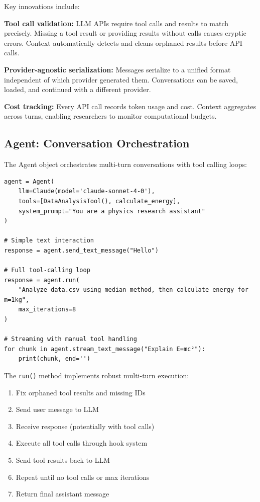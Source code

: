 \documentclass{article}
\begin{document}
Key innovations include:

\textbf{Tool call validation:} LLM APIs require tool calls and results to match precisely. Missing a tool result or providing results without calls causes cryptic errors. Context automatically detects and cleans orphaned results before API calls.

\textbf{Provider-agnostic serialization:} Messages serialize to a unified format independent of which provider generated them. Conversations can be saved, loaded, and continued with a different provider.

\textbf{Cost tracking:} Every API call records token usage and cost. Context aggregates across turns, enabling researchers to monitor computational budgets.

\subsection{Agent: Conversation Orchestration}

The Agent object orchestrates multi-turn conversations with tool calling loops:

\begin{verbatim}
agent = Agent(
    llm=Claude(model='claude-sonnet-4-0'),
    tools=[DataAnalysisTool(), calculate_energy],
    system_prompt="You are a physics research assistant"
)

# Simple text interaction
response = agent.send_text_message("Hello")

# Full tool-calling loop
response = agent.run(
    "Analyze data.csv using median method, then calculate energy for m=1kg",
    max_iterations=8
)

# Streaming with manual tool handling
for chunk in agent.stream_text_message("Explain E=mc²"):
    print(chunk, end='')
\end{verbatim}

The \texttt{run()} method implements robust multi-turn execution:
\begin{enumerate}
    \item Fix orphaned tool results and missing IDs
    \item Send user message to LLM
    \item Receive response (potentially with tool calls)
    \item Execute all tool calls through hook system
    \item Send tool results back to LLM
    \item Repeat until no tool calls or max iterations
    \item Return final assistant message
\end{enumerate}
\end{document}
